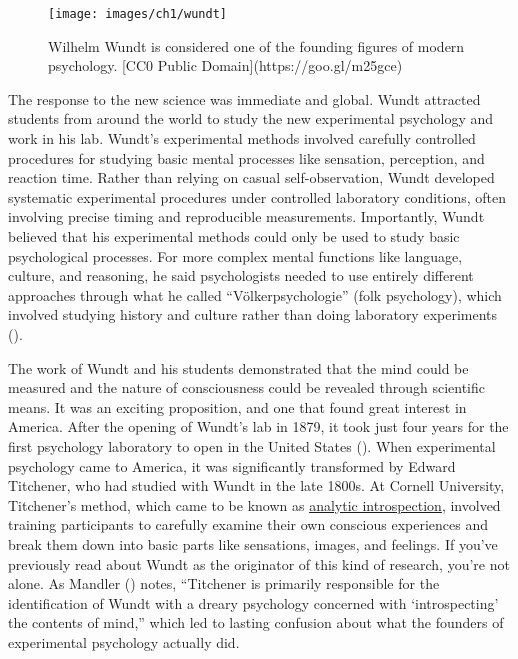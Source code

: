 \documentclass[
]{krantz}
\begin{document}
\begin{figure}

{\centering \texttt{[image: images/ch1/wundt]} 

}

\caption{Wilhelm Wundt is considered one of the founding figures of modern psychology. [CC0 Public Domain](https://goo.gl/m25gce)}\label{fig:wundt}
\end{figure}

The response to the new science was immediate and global. Wundt attracted students from around the world to study the new experimental psychology and work in his lab. Wundt's experimental methods involved carefully controlled procedures for studying basic mental processes like sensation, perception, and reaction time. Rather than relying on casual self-observation, Wundt developed systematic experimental procedures under controlled laboratory conditions, often involving precise timing and reproducible measurements. Importantly, Wundt believed that his experimental methods could only be used to study basic psychological processes. For more complex mental functions like language, culture, and reasoning, he said psychologists needed to use entirely different approaches through what he called ``Völkerpsychologie'' (folk psychology), which involved studying history and culture rather than doing laboratory experiments ().

The work of Wundt and his students demonstrated that the mind could be measured and the nature of consciousness could be revealed through scientific means. It was an exciting proposition, and one that found great interest in America. After the opening of Wundt's lab in 1879, it took just four years for the first psychology laboratory to open in the United States (). When experimental psychology came to America, it was significantly transformed by Edward Titchener, who had studied with Wundt in the late 1800s. At Cornell University, Titchener's method, which came to be known as \hyperref[analytic-introspection]{analytic introspection}, involved training participants to carefully examine their own conscious experiences and break them down into basic parts like sensations, images, and feelings. If you've previously read about Wundt as the originator of this kind of research, you're not alone. As Mandler () notes, ``Titchener is primarily responsible for the identification of Wundt with a dreary psychology concerned with `introspecting' the contents of mind,'' which led to lasting confusion about what the founders of experimental psychology actually did.
\end{document}
